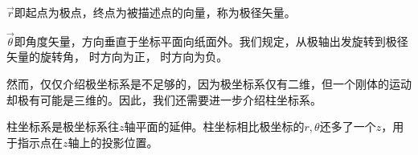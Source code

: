 \begin{Itemize}
	\item $\vec{r}$即起点为极点，终点为被描述点的向量，称为极径矢量。
	\item $\vec{\theta}$即角度矢量，方向垂直于坐标平面向纸面外。我们规定，从极轴出发旋转到极径矢量的旋转角， 时方向为正， 时方向为负\footnotemark。
\end{Itemize}

然而，仅仅介绍极坐标系是不足够的，因为极坐标系仅有二维，但一个刚体的运动却极有可能是三维的。因此，我们还需要进一步介绍柱坐标系。

柱坐标系是极坐标系往$z$轴平面的延伸。柱坐标相比极坐标的$r,\theta$还多了一个$z$，用于指示点在$z$轴上的投影位置。

